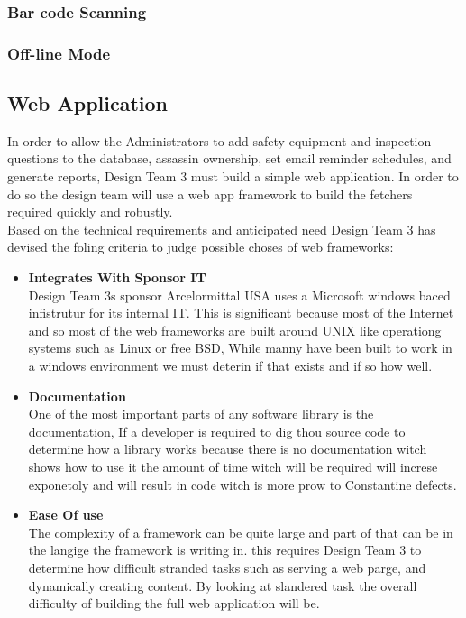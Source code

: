 \documentclass[Letter,11pt]{article}
\begin{document}
	\subsubsection{Bar code Scanning}
	
	\subsubsection{Off-line Mode}
	
	\subsection{Web Application}
		In order to allow the Administrators to add safety equipment and inspection questions to the database, assassin ownership, set email reminder schedules, and generate reports, Design Team 3 must build a simple web application. In order to do so the design team will use a web app framework to build the fetchers required quickly and robustly.
		\\
		Based on the technical requirements and anticipated need Design Team 3 has devised the foling criteria to judge possible choses of web frameworks: 
		\\
		\begin{minipage}[t]{0.5\textwidth}
		\begin{itemize}
			\item \textbf{Integrates With Sponsor IT}\\
			Design Team 3s sponsor Arcelormittal USA uses a Microsoft windows baced infistrutur for its internal IT. This is significant because  most of the Internet and so most of the web frameworks are built around UNIX like operationg systems such as Linux or free BSD, While manny have been built to work in a windows environment we must deterin if that exists and if so how well.
			
			\item \textbf{Documentation}\\
			One of the most important parts of any software library is the documentation, If a developer is required to dig thou source code to determine how a library works because there is no documentation witch shows how to use it the amount of time witch will be required will increse exponetoly and will result in code witch is more prow to Constantine defects.
				
			\item \textbf{Ease Of use} \\
			The complexity of a framework can be quite large and part of that can be in the langige the framework is writing in. this requires Design Team 3 to determine how difficult stranded tasks such as serving a web parge, and dynamically creating content. By looking at slandered task the overall difficulty of building the full web application will be.	
		\end{itemize}
		\end{minipage}
\end{document}
